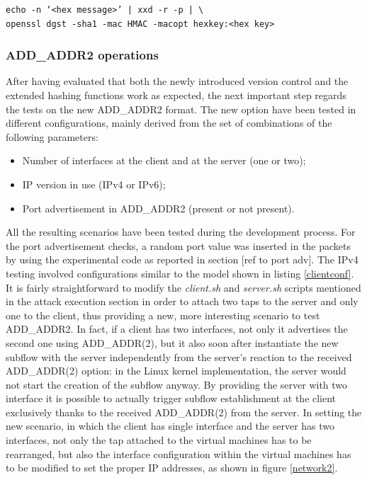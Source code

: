 \begin{verbatim}
echo -n ‘<hex message>’ | xxd -r -p | \
openssl dgst -sha1 -mac HMAC -macopt hexkey:<hex key>
\end{verbatim}
 
\subsubsection{ADD\_ADDR2 operations}
After having evaluated that both the newly introduced version control and the extended hashing functions work as expected, the next important step regards the tests on the new ADD\_ADDR2 format. The new option have been tested in different configurations, mainly derived from the set of combinations of the following parameters:
\begin{itemize}
  \item Number of interfaces at the client and at the server (one or two);
  \item IP version in use (IPv4 or IPv6);
  \item Port advertisement in ADD\_ADDR2 (present or not present).
\end{itemize}

All the resulting scenarios have been tested during the development process. For the port advertisement checks, a random port value was inserted in the packets by using the experimental code as reported in section [ref to port adv]. 
The IPv4 testing involved configurations similar to the model shown in listing \ref{clientconf}. It is fairly straightforward to modify the \textit{client.sh} and \textit{server.sh} scripts mentioned in the attack execution section in order to attach two taps to the server and only one to the client, thus providing a new, more interesting scenario to test ADD\_ADDR2. In fact, if a client has two interfaces, not only it advertises the second one using ADD\_ADDR(2), but it also soon after instantiate the new subflow with the server independently from the server's reaction to the received ADD\_ADDR(2) option: in the Linux kernel implementation, the server would not start the creation of the subflow anyway. 
By providing the server with two interface it is possible to actually trigger subflow establishment at the client exclusively thanks to the received ADD\_ADDR(2) from the server.
In setting the new scenario, in which the client has single interface and the server has two interfaces, not only the tap attached to the virtual machines has to be rearranged, but also the interface configuration within the virtual machines has to be modified to set the proper IP addresses, as shown in figure \ref{network2}.


